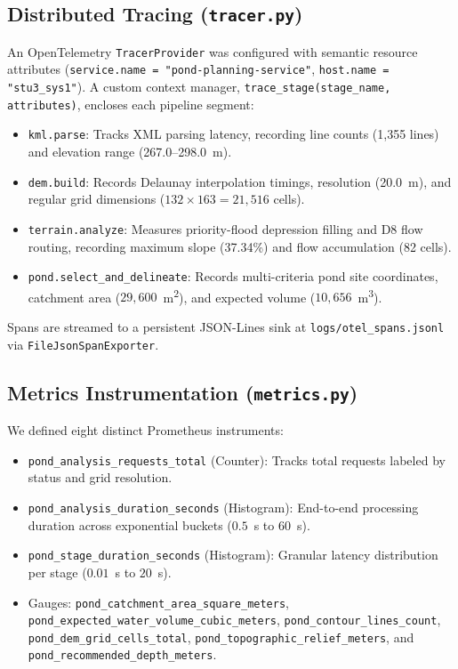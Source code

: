 \documentclass[manuscript,screen]{acmart}
\begin{document}
\subsection{Distributed Tracing (\texttt{tracer.py})}
An OpenTelemetry \texttt{TracerProvider} was configured with semantic resource attributes (\texttt{service.name = "pond-planning-service"}, \texttt{host.name = "stu3\_sys1"}). A custom context manager, \texttt{trace\_stage(stage\_name, attributes)}, encloses each pipeline segment:
\begin{itemize}
  \item \texttt{kml.parse}: Tracks XML parsing latency, recording line counts (1,355 lines) and elevation range (267.0--298.0~m).
  \item \texttt{dem.build}: Records Delaunay interpolation timings, resolution (20.0~m), and regular grid dimensions ($132 \times 163 = 21{,}516$ cells).
  \item \texttt{terrain.analyze}: Measures priority-flood depression filling and D8 flow routing, recording maximum slope (37.34\%) and flow accumulation (82 cells).
  \item \texttt{pond.select\_and\_delineate}: Records multi-criteria pond site coordinates, catchment area ($29{,}600$~m\textsuperscript{2}), and expected volume ($10{,}656$~m\textsuperscript{3}).
\end{itemize}
Spans are streamed to a persistent JSON-Lines sink at \texttt{logs/otel\_spans.jsonl} via \texttt{FileJsonSpanExporter}.

\subsection{Metrics Instrumentation (\texttt{metrics.py})}
We defined eight distinct Prometheus instruments:
\begin{itemize}
  \item \texttt{pond\_analysis\_requests\_total} (Counter): Tracks total requests labeled by status and grid resolution.
  \item \texttt{pond\_analysis\_duration\_seconds} (Histogram): End-to-end processing duration across exponential buckets ($0.5$~s to $60$~s).
  \item \texttt{pond\_stage\_duration\_seconds} (Histogram): Granular latency distribution per stage ($0.01$~s to $20$~s).
  \item Gauges: \texttt{pond\_catchment\_area\_square\_meters}, \texttt{pond\_expected\_water\_volume\_cubic\_meters}, \texttt{pond\_contour\_lines\_count}, \texttt{pond\_dem\_grid\_cells\_total}, \texttt{pond\_topographic\_relief\_meters}, and \texttt{pond\_recommended\_depth\_meters}.
\end{itemize}
\end{document}
